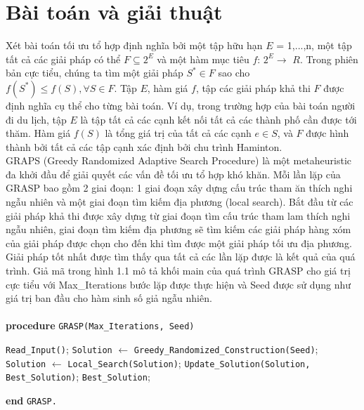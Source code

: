\documentclass[14pt,a4paper]{report}
\begin{document}
\section{Bài toán và giải thuật}
Xét bài toán tối ưu tổ hợp định nghĩa bởi một tập hữu hạn $E$ = {1,...,n}, một tập tất cả các giải pháp có thể $F\subseteq 2^E$ và một hàm mục tiêu $f$: $2^E \rightarrow$ $R$. Trong phiên bản cực tiểu, chúng ta tìm một giải pháp $S^* \in F$ sao cho $f(S^*) \leq f(S), \forall S \in F$. Tập $E$, hàm giá $f$, tập các giải pháp khả thi $F$ được định nghĩa cụ thể cho từng bài toán. Ví dụ, trong trường hợp của bài toán người đi du lịch, tập $E$ là tập tất cả các cạnh kết nối tất cả các thành phố cần được tới thăm. Hàm giá $f(S)$ là tổng giá trị của tất cả các cạnh $e \in S$, và $F$ được hình thành bởi tất cả các tập cạnh xác định bởi chu trình Haminton.\\
GRAPS (Greedy Randomized Adaptive Search Procedure) là một metaheuristic đa khởi đầu để giải quyết các vấn đề tối ưu tổ hợp khó khăn. Mỗi lần lặp của GRASP bao gồm 2 giai đoạn: 1 giai đoạn xây dựng cấu trúc tham ăn thích nghi ngẫu nhiên và một giai đoạn tìm kiếm địa phương (local search). Bắt đầu từ các giải pháp khả thi được xây dựng từ giai đoạn tìm cấu trúc tham lam thích nghi ngẫu nhiên, giai đoạn tìm kiếm địa phương sẽ tìm kiếm các giải pháp hàng xóm của giải pháp được chọn cho đến khi tìm được một giải pháp tối ưu địa phương. Giải pháp tốt nhất được tìm thấy qua tất cả các lần lặp được là kết quả của quá trình. Giả mã trong hình 1.1 mô tả khối main của quá trình GRASP cho giá trị cực tiểu với Max\_Iterations bước lặp được thực hiện và Seed được sử dụng như giá trị ban đầu cho hàm sinh số giả ngẫu nhiên.\\ \\

{\bf procedure} \texttt{GRASP(Max\_Iterations, Seed)}
\begin{algorithmic} [1] 
	\STATE \texttt{Read\_Input()};
	\STATE \texttt{Solution} $\leftarrow$ \texttt{Greedy\_Randomized\_Construction(Seed)};
	\STATE \texttt{Solution} $\leftarrow$ \texttt{Local\_Search(Solution)};
	\STATE \texttt{Update\_Solution(Solution, Best\_Solution)};
	\ENDFOR
	 \texttt{Best\_Solution};
\end{algorithmic}
{\bf end} \texttt{GRASP.}\\
\end{document}
